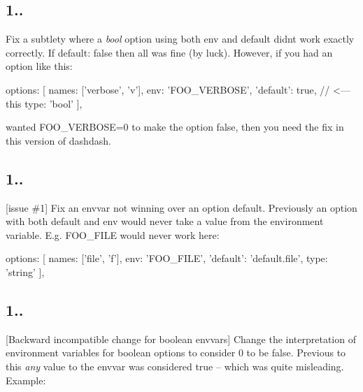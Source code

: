 \subsection*{1..}


\begin{DoxyItemize}
\item Fix a subtlety where a {\itshape bool} option using both {\ttfamily env} and {\ttfamily default} didn\textquotesingle{}t work exactly correctly. If {\ttfamily default\+: false} then all was fine (by luck). However, if you had an option like this\+: \begin{DoxyVerb}  options: [ {
      names: ['verbose', 'v'],
      env: 'FOO_VERBOSE',
      'default': true,    // <--- this
      type: 'bool'
  } ],
\end{DoxyVerb}


wanted {\ttfamily F\+O\+O\+\_\+\+V\+E\+R\+B\+O\+SE=0} to make the option false, then you need the fix in this version of dashdash.
\end{DoxyItemize}

\subsection*{1..}


\begin{DoxyItemize}
\item \mbox{[}issue \#1\mbox{]} Fix an envvar not winning over an option \textquotesingle{}default\textquotesingle{}. Previously an option with both {\ttfamily default} and {\ttfamily env} would never take a value from the environment variable. E.\+g. {\ttfamily F\+O\+O\+\_\+\+F\+I\+LE} would never work here\+: \begin{DoxyVerb}  options: [ {
      names: ['file', 'f'],
      env: 'FOO_FILE',
      'default': 'default.file',
      type: 'string'
  } ],
\end{DoxyVerb}

\end{DoxyItemize}

\subsection*{1..}


\begin{DoxyItemize}
\item \mbox{[}Backward incompatible change for boolean envvars\mbox{]} Change the interpretation of environment variables for boolean options to consider \textquotesingle{}0\textquotesingle{} to be false. Previous to this {\itshape any} value to the envvar was considered true -- which was quite misleading. Example\+: 

\end{DoxyItemize}

